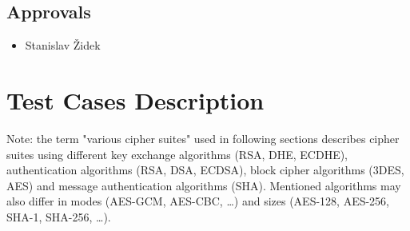 \section{Approvals}
    \begin{itemize}
        \item Stanislav Židek
    \end{itemize}

\chapter{Test Cases Description} \label{ref:test-case-description}
    Note: the term "various cipher suites" used in following sections describes
    cipher suites using different key exchange algorithms (RSA, DHE, ECDHE),
    authentication algorithms (RSA, DSA, ECDSA), block cipher algorithms
    (3DES, AES) and message authentication algorithms (SHA). Mentioned
    algorithms may also differ in modes (AES-GCM, AES-CBC, \dots) and sizes
    (AES-128, AES-256, SHA-1, SHA-256, \dots).

